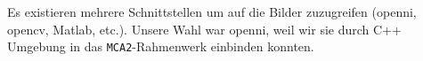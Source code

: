 %
%
%
%
%
%

Es existieren mehrere Schnittstellen um auf die Bilder zuzugreifen (\gls{openni}, \gls{opencv}, Matlab, etc.).
 Unsere Wahl war \gls{openni}, weil wir sie durch C++ Umgebung in das
 \lstinline{MCA2}-Rahmenwerk einbinden konnten.

